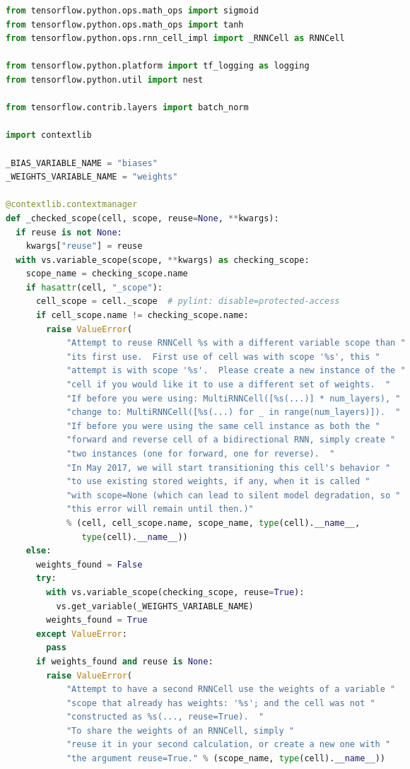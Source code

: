 \begin{landscape}
\begin{multicols}{2}
\begin{lstlisting}[language=Python]
from tensorflow.python.ops.math_ops import sigmoid
from tensorflow.python.ops.math_ops import tanh
from tensorflow.python.ops.rnn_cell_impl import _RNNCell as RNNCell

from tensorflow.python.platform import tf_logging as logging
from tensorflow.python.util import nest

from tensorflow.contrib.layers import batch_norm

import contextlib

_BIAS_VARIABLE_NAME = "biases"
_WEIGHTS_VARIABLE_NAME = "weights"

@contextlib.contextmanager
def _checked_scope(cell, scope, reuse=None, **kwargs):
  if reuse is not None:
    kwargs["reuse"] = reuse
  with vs.variable_scope(scope, **kwargs) as checking_scope:
    scope_name = checking_scope.name
    if hasattr(cell, "_scope"):
      cell_scope = cell._scope  # pylint: disable=protected-access
      if cell_scope.name != checking_scope.name:
        raise ValueError(
            "Attempt to reuse RNNCell %s with a different variable scope than "
            "its first use.  First use of cell was with scope '%s', this "
            "attempt is with scope '%s'.  Please create a new instance of the "
            "cell if you would like it to use a different set of weights.  "
            "If before you were using: MultiRNNCell([%s(...)] * num_layers), "
            "change to: MultiRNNCell([%s(...) for _ in range(num_layers)]).  "
            "If before you were using the same cell instance as both the "
            "forward and reverse cell of a bidirectional RNN, simply create "
            "two instances (one for forward, one for reverse).  "
            "In May 2017, we will start transitioning this cell's behavior "
            "to use existing stored weights, if any, when it is called "
            "with scope=None (which can lead to silent model degradation, so "
            "this error will remain until then.)"
            % (cell, cell_scope.name, scope_name, type(cell).__name__,
               type(cell).__name__))
    else:
      weights_found = False
      try:
        with vs.variable_scope(checking_scope, reuse=True):
          vs.get_variable(_WEIGHTS_VARIABLE_NAME)
        weights_found = True
      except ValueError:
        pass
      if weights_found and reuse is None:
        raise ValueError(
            "Attempt to have a second RNNCell use the weights of a variable "
            "scope that already has weights: '%s'; and the cell was not "
            "constructed as %s(..., reuse=True).  "
            "To share the weights of an RNNCell, simply "
            "reuse it in your second calculation, or create a new one with "
            "the argument reuse=True." % (scope_name, type(cell).__name__))


\end{lstlisting}
\end{multicols}
\end{landscape}
